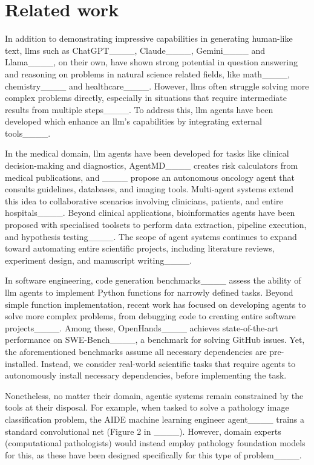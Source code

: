 \section{Related work}
In addition to demonstrating impressive capabilities in generating human-like text, \glspl{llm} such as ChatGPT____, Claude____, Gemini____ and Llama____, on their own, have shown strong potential in question answering and reasoning on problems in natural science related fields, like math____, chemistry____ and healthcare____. However, \glspl{llm} often struggle solving more complex problems directly, especially in situations that require intermediate results from multiple steps____. 
To address this, \gls{llm} agents have been developed which enhance an \gls{llm}'s capabilities by integrating external tools____.

In the medical domain, \gls{llm} agents have been developed for tasks like clinical decision-making and diagnostics, \eg AgentMD____ creates risk calculators from medical publications, and ____ propose an autonomous oncology agent that consults guidelines, databases, and imaging tools. Multi-agent systems extend this idea to collaborative scenarios involving clinicians, patients, and entire hospitals____. Beyond clinical applications, bioinformatics agents have been proposed with specialised toolsets to perform data extraction, pipeline execution, and hypothesis testing____. 
The scope of agent systems continues to expand toward automating entire scientific projects, including literature reviews, experiment design, and manuscript writing____.

In software engineering, code generation benchmarks____ assess the ability of \gls{llm} agents to implement Python functions for narrowly defined tasks.
Beyond simple function implementation, recent work has focused on developing agents to solve more complex problems, from debugging code to creating entire software projects____.
Among these, OpenHands____ achieves state-of-the-art performance on SWE-Bench____, a benchmark for solving GitHub issues. 
Yet, the aforementioned benchmarks assume all necessary dependencies are pre-installed.
Instead, we consider real-world scientific tasks that require agents to autonomously install necessary dependencies, before implementing the task.

Nonetheless, no matter their domain, agentic systems remain constrained by the tools at their disposal. 
For example, when tasked to solve a pathology image classification problem, the AIDE machine learning engineer agent____ trains a standard convolutional net (\cf Figure 2 in ____).
However, domain experts (computational pathologists) would instead employ pathology foundation models for this, as these have been designed specifically for this type of problem____.


